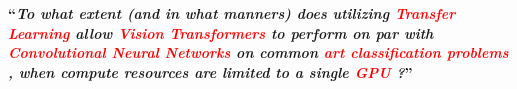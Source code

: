 \newcommand{\toexplain}[1]{
    \textcolor<2>{white}{\textcolor<3>{red}{#1}}
}
\begin{frame}
\begin{center}
\textbf{\large ``\textit{To what extent (and in what manners) does utilizing \toexplain{Transfer Learning} allow \toexplain{Vision Transformers} to perform on par with \toexplain{Convolutional Neural Networks} on common \toexplain{art classification problems}, when compute resources are limited to a single \toexplain{GPU}?}''}
\end{center}
\end{frame}



%


